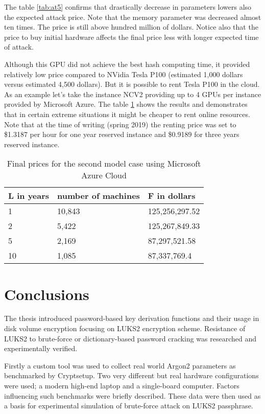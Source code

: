 \documentclass[nolof]{fithesis3}
\begin{document}
The table \ref{tab:at5} confirms that drastically decrease in parameters lowers also the expected attack price. Note that the memory parameter was decreased almost ten times. The price is still above hundred million of dollars. Notice also that the price to buy initial hardware affects the final price less with longer expected time of attack.

Although this GPU did not achieve the best hash computing time, it provided relatively low price compared to NVidia Tesla P100 (estimated 1,000 dollars versus estimated 4,500 dollars). But it is possible to rent Tesla P100 in the cloud. As an example let's take the instance NCV2 providing up to 4 GPUs per instance provided by Microsoft Azure. The table \ref{tab:at6} shows the results and demonstrates that in certain extreme situations it might be cheaper to rent online resources. Note that at the time of writing (spring 2019) the renting price was set to \$1.3187 per hour for one year reserved instance and \$0.9189 for three years reserved instance.


\noindent
\begin{table}
\caption{Final prices for the second model case using Microsoft Azure Cloud}
\label{tab:at6}
\begin{tabularx}{\textwidth}{| X | X | X |}
\hline
L  in years & number of machines & F in dollars\\
\hline
1 & 10,843 & 125,256,297.52\\
\hline
2 & 5,422 & 125,267,849.33\\
\hline
5 & 2,169 & 87,297,521.58\\
\hline
10 & 1,085 & 87,337,769.4\\
\hline
\end{tabularx}
\end{table}

\chapter{Conclusions}
The thesis introduced password-based key derivation functions and their usage in disk volume encryption focusing on LUKS2 encryption scheme. Resistance of LUKS2 to brute-force or dictionary-based password cracking was researched and experimentally verified.

Firstly a custom tool was used to collect real world Argon2 parameters as benchmarked by Cryptsetup. Two very different but real hardware configurations were used; a modern high-end laptop and a single-board computer. Factors influencing such benchmarks were briefly described. These data were then used as a basis for experimental simulation of brute-force attack on LUKS2 passphrase.
\end{document}
